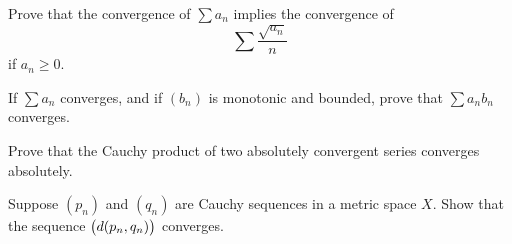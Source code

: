 \begin{exercise}
Prove that the convergence of $\sum a_n$ implies the convergence of
\[\sum\frac{\sqrt{a_n}}{n}\]
if $a_n\ge0$.
\end{exercise}

\begin{exercise}
If $\sum a_n$ converges, and if $(b_n)$ is monotonic and bounded, prove that $\sum a_nb_n$ converges.
\end{exercise}

\begin{exercise}
Prove that the Cauchy product of two absolutely convergent series converges absolutely.
\end{exercise}

\begin{exercise}
Suppose $(p_n)$ and $(q_n)$ are Cauchy sequences in a metric space $X$. Show that the sequence $\left(d(p_n,q_n)\right)$ converges.
\end{exercise}